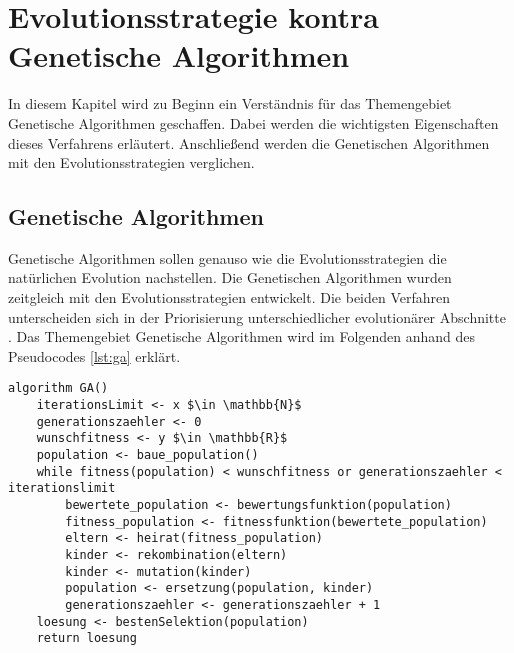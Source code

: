 \section{Evolutionsstrategie kontra Genetische Algorithmen}
In diesem Kapitel wird zu Beginn ein Verständnis für das Themengebiet Genetische Algorithmen geschaffen. Dabei werden die wichtigsten Eigenschaften dieses Verfahrens erläutert. Anschließend werden die Genetischen Algorithmen mit den Evolutionsstrategien verglichen.


\subsection{Genetische Algorithmen}
Genetische Algorithmen sollen genauso wie die Evolutionsstrategien die natürlichen Evolution nachstellen.
Die Genetischen Algorithmen wurden zeitgleich mit den Evolutionsstrategien entwickelt. Die beiden Verfahren unterscheiden sich in der Priorisierung unterschiedlicher evolutionärer Abschnitte \cite[S. 185]{schoeneburg}.
Das Themengebiet Genetische Algorithmen wird im Folgenden anhand des Pseudocodes \ref{lst:ga} erklärt.

\begin{lstlisting}[caption={Grundlegender Genetischer Algorithmus}, firstnumber=1, captionpos=b, label=lst:ga]
algorithm GA()
	iterationsLimit <- x $\in \mathbb{N}$
	generationszaehler <- 0
	wunschfitness <- y $\in \mathbb{R}$
	population <- baue_population()
	while fitness(population) < wunschfitness or generationszaehler < iterationslimit
		bewertete_population <- bewertungsfunktion(population)
		fitness_population <- fitnessfunktion(bewertete_population)
		eltern <- heirat(fitness_population)
		kinder <- rekombination(eltern)
		kinder <- mutation(kinder)
		population <- ersetzung(population, kinder)
		generationszaehler <- generationszaehler + 1
	loesung <- bestenSelektion(population)
	return loesung
\end{lstlisting}

